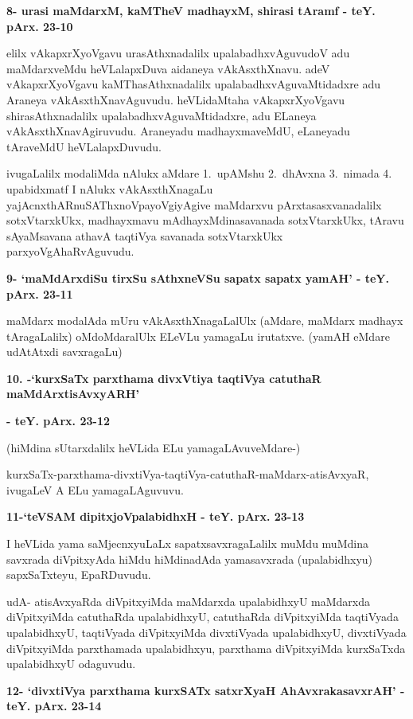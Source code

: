 \medskip
\noindent
\textbf{8- urasi maMdarxM, kaMTheV madhayxM, shirasi tAramf - teY. pArx. 23-10}

\smallskip
elilx vAkapxrXyoVgavu urasAthxnadalilx upalabadhxvAguvudoV adu maMdarxveMdu heVLalapxDuva aidaneya vAkAsxthXnavu. adeV vAkapxrXyoVgavu kaMThasAthxnadalilx upalabadhxvAguvaMtidadxre adu Araneya vAkAsxthXnavAguvudu. heVLidaMtaha vAkapxrXyoVgavu shirasAthxnadalilx upalabadhxvAguvaMtidadxre, adu ELaneya vAkAsxthXnavAgiruvudu. Araneyadu madhayxmaveMdU, eLaneyadu tAraveMdU heVLalapxDuvudu.

ivugaLalilx modaliMda nAlukx aMdare 1.~upAMshu 2.~dhAvxna 3.~\hbox{nimada} 4. upabidxmatf I nAlukx vAkAsxthXnagaLu yajAcnxthARnuSAThxnoVpayoVgiyAgive maMdarxvu pArxtasasxvanadalilx sotxVtarxkUkx, madhayxmavu mAdhayxMdinasavanada sotxVtarxkUkx, tAravu sAyaMsavana athavA taqtiVya savanada sotxVtarxkUkx parxyoVgAhaRvAguvudu.

\medskip
\noindent
\textbf{9- `maMdArxdiSu tirxSu sAthxneVSu sapatx sapatx yamAH' - teY. pArx. 23-11}

\smallskip
maMdarx modalAda mUru vAkAsxthXnagaLalUlx (aMdare, maMdarx madhayx tAragaLalilx) oMdoMdaralUlx ELeVLu yamagaLu irutatxve. (yamAH eMdare udAtAtxdi savxragaLu)


\medskip
\noindent
\textbf{10. -`kurxSaTx parxthama divxVtiya taqtiVya catuthaR maMdArxtisAvxyARH'}

\textbf{- teY. pArx. 23-12}

\smallskip
(hiMdina sUtarxdalilx heVLida ELu yamagaLAvuveMdare-)

kurxSaTx-parxthama-divxtiVya-taqtiVya-catuthaR-maMdarx-atisAvxyaR, ivugaLeV A ELu yamagaLAguvuvu.

\eject

\noindent
\textbf{11-`teVSAM dipitxjoVpalabidhxH - teY. pArx. 23-13}

\smallskip
I heVLida yama saMjecnxyuLaLx sapatxsavxragaLalilx muMdu muMdina savxrada diVpitxyAda hiMdu hiMdinadAda yamasavxrada (upalabidhxyu) sapxSaTxteyu, EpaRDuvudu. 

udA- atisAvxyaRda diVpitxyiMda maMdarxda upalabidhxyU maMdarxda diVpitxyiMda catuthaRda upalabidhxyU, catuthaRda diVpitxyiMda taqtiVyada upalabidhxyU, taqtiVyada diVpitxyiMda divxtiVyada upalabidhxyU, divxtiVyada diVpitxyiMda parxthamada upalabidhxyu, parxthama diVpitxyiMda kurxSaTxda upalabidhxyU odaguvudu.

\medskip
\noindent
\textbf{12- `divxtiVya parxthama kurxSATx satxrXyaH AhAvxrakasavxrAH' - teY. pArx. 23-14}

